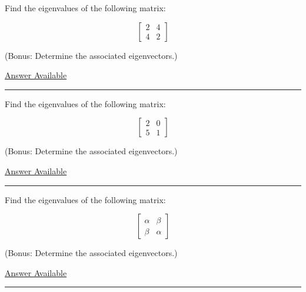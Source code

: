 \documentclass[]{memoir}
\begin{document}

Find the eigenvalues of the following matrix:

\[
\begin{bmatrix} 2 & 4 \\  4 & 2 \end{bmatrix}
\]

(Bonus: Determine the associated eigenvectors.)

\hyperref[Ans-11-12]{Answer Available}

\begin{center}\rule{3in}{0.4pt}\end{center}


Find the eigenvalues of the following matrix:

\[
\begin{bmatrix} 2 & 0 \\  5 & 1 \end{bmatrix}
\]

(Bonus: Determine the associated eigenvectors.)

\hyperref[Ans-11-13]{Answer Available}

\begin{center}\rule{3in}{0.4pt}\end{center}


Find the eigenvalues of the following matrix:

\[
\begin{bmatrix} \alpha & \beta \\  \beta & \alpha \end{bmatrix}
\]

(Bonus: Determine the associated eigenvectors.)

\hyperref[Ans-11-14]{Answer Available}

\begin{center}\rule{3in}{0.4pt}\end{center}
\end{document}

